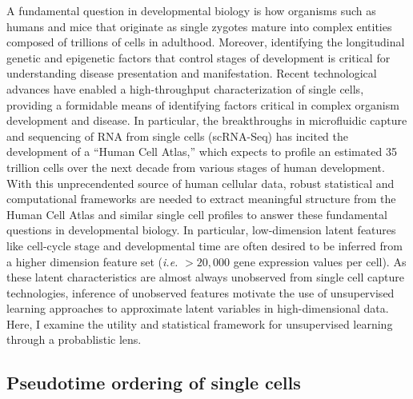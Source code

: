 \documentclass[english, 11pt]{article}\usepackage[]{graphicx}\usepackage[]{color}
\begin{document}
A fundamental question in developmental biology is how organisms such as humans and mice that originate as single zygotes mature into complex entities composed of trillions of cells in adulthood. Moreover, identifying the longitudinal genetic and epigenetic factors that control stages of development is critical for understanding disease presentation and manifestation.  Recent technological advances have enabled a high-throughput characterization of single cells, providing a formidable means of identifying factors critical in complex organism development and disease. In particular, the breakthroughs in microfluidic capture and sequencing of RNA from single cells (scRNA-Seq) has incited the development of a ``Human Cell Atlas,'' which expects to profile an estimated 35 trillion cells over the next decade from various stages of human development. \cite{HCA} 
\newline  \newline 
\noindent With this unprecendented source of human cellular data, robust statistical and computational frameworks are needed to extract meaningful structure from the Human Cell Atlas and similar single cell profiles to answer these fundamental questions in developmental biology. In particular, low-dimension latent features like cell-cycle stage and developmental time are often desired to be inferred from a higher dimension feature set (\textit{i.e.} $> 20,000$ gene expression values per cell). As these latent characteristics are almost always unobserved from single cell capture technologies, inference of unobserved features motivate the use of unsupervised learning approaches to approximate latent variables in high-dimensional data. Here, I examine the utility and statistical framework for unsupervised learning through a probablistic lens. 


\subsection{Pseudotime ordering of single cells}
\end{document}
